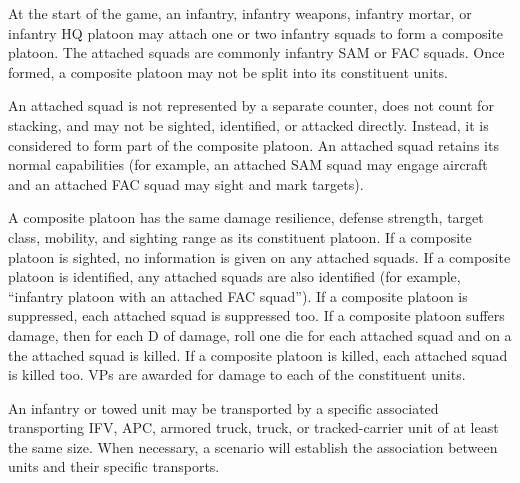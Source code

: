 
At the start of the game, an infantry, infantry weapons, infantry mortar, or infantry HQ platoon may attach one or two infantry squads to form a composite platoon.
The attached squads are commonly infantry SAM or FAC squads.
Once formed, a composite platoon may not be split into its constituent units.%

An attached squad is not represented by a separate counter, does not count for stacking, and may not be sighted, identified, or attacked directly.
Instead, it is considered to form part of the composite platoon.
An attached squad retains its normal capabilities (for example, an attached SAM squad may engage aircraft and an attached FAC squad may sight and mark targets).

A composite platoon has the same damage resilience, defense strength, target class, mobility, and sighting range as its constituent platoon.
If a composite platoon is sighted, no information is given on any attached squads.
If a composite platoon is identified, any attached squads are also identified (for example, “infantry platoon with an attached FAC squad”).
If a composite platoon is suppressed, each attached squad is suppressed too.
If a composite platoon suffers damage, then for each D of damage, roll one die for each attached squad and on a  the attached squad is killed.
If a composite platoon is killed, each attached squad is killed too.
VPs are awarded for damage to each of the constituent units.%


An infantry or towed unit may be transported by a specific associated transporting IFV, APC, armored truck, truck, or tracked-carrier unit of at least the same size.
When necessary, a scenario will establish the association between units and their specific transports.
%

